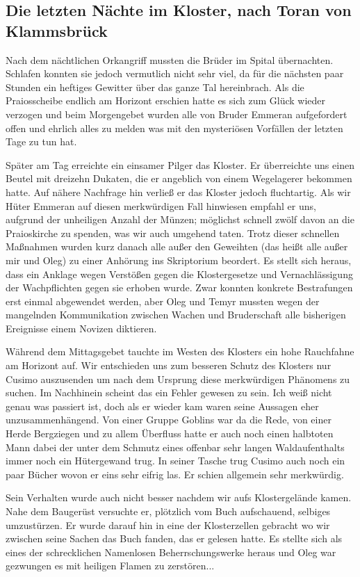 \documentclass[11pt]{scrreprt}
\begin{document}
\subsection{Die letzten Nächte im Kloster, nach Toran von Klammsbrück}

Nach dem nächtlichen Orkangriff mussten die Brüder im Spital übernachten. Schlafen konnten sie jedoch vermutlich nicht sehr viel, da für die nächsten paar Stunden ein heftiges Gewitter über das ganze Tal hereinbrach. Als die Praiosscheibe endlich am Horizont erschien hatte es sich zum Glück wieder verzogen und beim Morgengebet wurden alle von Bruder Emmeran aufgefordert offen und ehrlich alles zu melden was mit den mysteriösen Vorfällen der letzten Tage zu tun hat.\par
Später am Tag erreichte ein einsamer Pilger das Kloster. Er überreichte uns einen Beutel mit dreizehn Dukaten, die er angeblich von einem Wegelagerer bekommen hatte. Auf nähere Nachfrage hin verließ er das Kloster jedoch fluchtartig. Als wir Hüter Emmeran auf diesen merkwürdigen Fall hinwiesen empfahl er uns, aufgrund der unheiligen Anzahl der Münzen; möglichst schnell zwölf davon an die Praioskirche zu spenden, was wir auch umgehend taten.
Trotz dieser schnellen Maßnahmen wurden kurz danach alle außer den Geweihten (das heißt alle außer mir und Oleg) zu einer Anhörung ins Skriptorium beordert. Es stellt sich heraus, dass ein Anklage wegen Verstößen gegen die Klostergesetze und Vernachlässigung der Wachpflichten gegen sie erhoben wurde. Zwar konnten konkrete Bestrafungen erst einmal abgewendet werden, aber Oleg und Temyr mussten wegen der mangelnden Kommunikation zwischen Wachen und Bruderschaft alle bisherigen Ereignisse einem Novizen diktieren.\par
Während dem Mittagsgebet tauchte im Westen des Klosters ein hohe Rauchfahne am Horizont auf. Wir entschieden uns zum besseren Schutz des Klosters nur Cusimo auszusenden um nach dem Ursprung diese merkwürdigen Phänomens zu suchen. Im Nachhinein scheint das ein Fehler gewesen zu sein. Ich weiß nicht genau was passiert ist, doch als er wieder kam waren seine Aussagen eher unzusammenhängend. Von einer Gruppe Goblins war da die Rede, von einer Herde Bergziegen und zu allem Überfluss hatte er auch noch einen halbtoten Mann dabei der unter dem Schmutz eines offenbar sehr langen Waldaufenthalts immer noch ein Hütergewand trug. In seiner Tasche trug Cusimo auch noch ein paar Bücher wovon er eins sehr eifrig las. Er schien allgemein sehr merkwürdig.\par
Sein Verhalten wurde auch nicht besser nachdem wir aufs Klostergelände kamen. Nahe dem Baugerüst versuchte er, plötzlich vom Buch aufschauend, selbiges umzustürzen. Er wurde darauf hin in eine der Klosterzellen gebracht wo wir zwischen seine Sachen das Buch fanden, das er gelesen hatte. Es stellte sich als eines der schrecklichen Namenlosen Beherrschungswerke heraus und Oleg war gezwungen es mit heiligen Flamen zu zerstören... 
\end{document}
